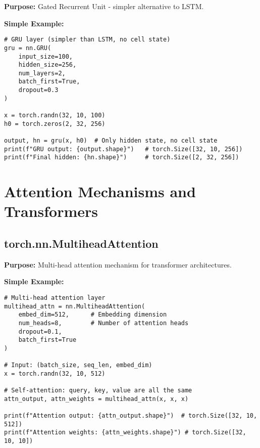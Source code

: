 \documentclass[11pt,a4paper]{book}
\begin{document}
\textbf{Purpose:} Gated Recurrent Unit - simpler alternative to LSTM.

\textbf{Simple Example:}
\begin{verbatim}
# GRU layer (simpler than LSTM, no cell state)
gru = nn.GRU(
    input_size=100,
    hidden_size=256,
    num_layers=2,
    batch_first=True,
    dropout=0.3
)

x = torch.randn(32, 10, 100)
h0 = torch.zeros(2, 32, 256)

output, hn = gru(x, h0)  # Only hidden state, no cell state
print(f"GRU output: {output.shape}")   # torch.Size([32, 10, 256])
print(f"Final hidden: {hn.shape}")     # torch.Size([2, 32, 256])
\end{verbatim}

\section{Attention Mechanisms and Transformers}

\subsection{torch.nn.MultiheadAttention}

\textbf{Purpose:} Multi-head attention mechanism for transformer architectures.

\textbf{Simple Example:}
\begin{verbatim}
# Multi-head attention layer
multihead_attn = nn.MultiheadAttention(
    embed_dim=512,      # Embedding dimension
    num_heads=8,        # Number of attention heads
    dropout=0.1,
    batch_first=True
)

# Input: (batch_size, seq_len, embed_dim)
x = torch.randn(32, 10, 512)

# Self-attention: query, key, value are all the same
attn_output, attn_weights = multihead_attn(x, x, x)

print(f"Attention output: {attn_output.shape}")  # torch.Size([32, 10, 512])
print(f"Attention weights: {attn_weights.shape}") # torch.Size([32, 10, 10])
\end{verbatim}
\end{document}
